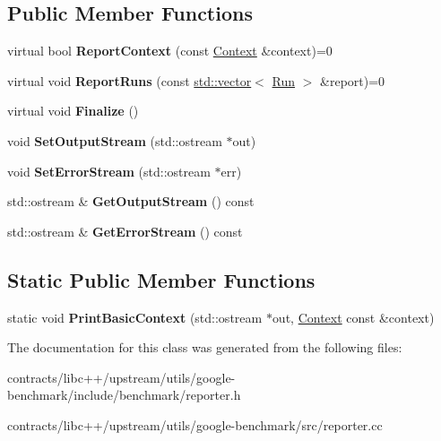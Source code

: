 \subsection*{Public Member Functions}
\begin{DoxyCompactItemize}
\item 
\mbox{\label{classbenchmark_1_1_benchmark_reporter_a0d1834470fe47a308a8f5c8b9900706e}} 
virtual bool {\bfseries Report\+Context} (const \mbox{\hyperlink{structbenchmark_1_1_benchmark_reporter_1_1_context}{Context}} \&context)=0
\item 
\mbox{\label{classbenchmark_1_1_benchmark_reporter_a9b4fd50b7b1d441d7ca44249a5971ad8}} 
virtual void {\bfseries Report\+Runs} (const \mbox{\hyperlink{classstd_1_1vector}{std\+::vector}}$<$ \mbox{\hyperlink{structbenchmark_1_1_benchmark_reporter_1_1_run}{Run}} $>$ \&report)=0
\item 
\mbox{\label{classbenchmark_1_1_benchmark_reporter_aa9116282f2e2fa984ee7f11d53d5fa15}} 
virtual void {\bfseries Finalize} ()
\item 
\mbox{\label{classbenchmark_1_1_benchmark_reporter_a703e2a25fee7050b7badd1922dca945d}} 
void {\bfseries Set\+Output\+Stream} (std\+::ostream $\ast$out)
\item 
\mbox{\label{classbenchmark_1_1_benchmark_reporter_a9289e45f81a88cab04dbdaf8f102c4e3}} 
void {\bfseries Set\+Error\+Stream} (std\+::ostream $\ast$err)
\item 
\mbox{\label{classbenchmark_1_1_benchmark_reporter_a8579c6156afd8a0c5c7569262dcf034d}} 
std\+::ostream \& {\bfseries Get\+Output\+Stream} () const
\item 
\mbox{\label{classbenchmark_1_1_benchmark_reporter_a748af2901286cb8118f940ef3e04d8b3}} 
std\+::ostream \& {\bfseries Get\+Error\+Stream} () const
\end{DoxyCompactItemize}
\subsection*{Static Public Member Functions}
\begin{DoxyCompactItemize}
\item 
\mbox{\label{classbenchmark_1_1_benchmark_reporter_a2c34777aff00c141056eb52292808099}} 
static void {\bfseries Print\+Basic\+Context} (std\+::ostream $\ast$out, \mbox{\hyperlink{structbenchmark_1_1_benchmark_reporter_1_1_context}{Context}} const \&context)
\end{DoxyCompactItemize}


The documentation for this class was generated from the following files\+:\begin{DoxyCompactItemize}
\item 
contracts/libc++/upstream/utils/google-\/benchmark/include/benchmark/reporter.\+h\item 
contracts/libc++/upstream/utils/google-\/benchmark/src/reporter.\+cc\end{DoxyCompactItemize}
